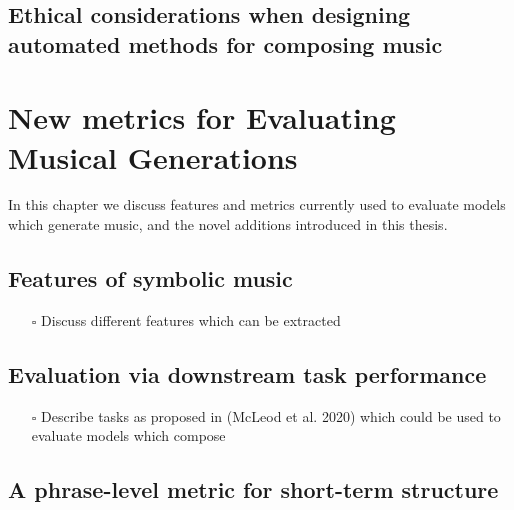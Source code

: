 \documentclass[12pt,a4paper,]{report}
\providecommand{\tightlist}{%
  \setlength{\itemsep}{0pt}\setlength{\parskip}{0pt}}
\begin{document}
\hypertarget{ethical-considerations-when-designing-automated-methods-for-composing-music}{%
\section{Ethical considerations when designing automated methods for
composing
music}\label{ethical-considerations-when-designing-automated-methods-for-composing-music}}

\hypertarget{new-metrics-for-evaluating-musical-generations}{%
\chapter{New metrics for Evaluating Musical
Generations}\label{new-metrics-for-evaluating-musical-generations}}

In this chapter we discuss features and metrics currently used to
evaluate models which generate music, and the novel additions introduced
in this thesis.

\hypertarget{features-of-symbolic-music}{%
\section{Features of symbolic music}\label{features-of-symbolic-music}}

\begin{itemize}
\tightlist
\item[$\square$]
  Discuss different features which can be extracted
\end{itemize}

\hypertarget{evaluation-via-downstream-task-performance}{%
\section{Evaluation via downstream task
performance}\label{evaluation-via-downstream-task-performance}}

\begin{itemize}
\tightlist
\item[$\square$]
  Describe tasks as proposed in (McLeod et al. 2020) which could be used
  to evaluate models which compose
\end{itemize}

\hypertarget{a-phrase-level-metric-for-short-term-structure}{%
\section{A phrase-level metric for short-term
structure}\label{a-phrase-level-metric-for-short-term-structure}}
\end{document}
